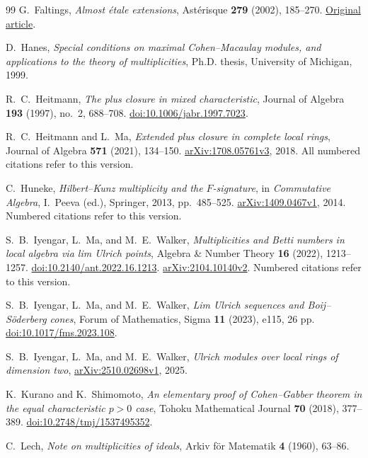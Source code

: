 \begin{thebibliography}{99}
G.~Faltings,
\emph{Almost \'etale extensions},
Ast\'erisque \textbf{279} (2002), 185--270.
\href{https://numdam.org/item/AST_2002__279__185_0/}{Original article}.

D.~Hanes,
\emph{Special conditions on maximal Cohen--Macaulay modules, and
applications to the theory of multiplicities},
Ph.D. thesis, University of Michigan, 1999.

R.~C.~Heitmann,
\emph{The plus closure in mixed characteristic},
Journal of Algebra \textbf{193} (1997), no.~2, 688--708.
\href{https://doi.org/10.1006/jabr.1997.7023}{doi:10.1006/jabr.1997.7023}.

R.~C.~Heitmann and L.~Ma,
\emph{Extended plus closure in complete local rings},
Journal of Algebra \textbf{571} (2021), 134--150.
\href{https://arxiv.org/abs/1708.05761v3}{arXiv:1708.05761v3}, 2018.
All numbered citations refer to this version.

C.~Huneke,
\emph{Hilbert--Kunz multiplicity and the $F$-signature},
in \emph{Commutative Algebra}, I.~Peeva (ed.),
Springer, 2013, pp.~485--525.
\href{https://arxiv.org/abs/1409.0467v1}{arXiv:1409.0467v1}, 2014.
Numbered citations refer to this version.

S.~B.~Iyengar, L.~Ma, and M.~E.~Walker,
\emph{Multiplicities and Betti numbers in local algebra via lim Ulrich points},
Algebra \& Number Theory \textbf{16} (2022), 1213--1257.
\href{https://doi.org/10.2140/ant.2022.16.1213}{doi:10.2140/ant.2022.16.1213}.
\href{https://arxiv.org/abs/2104.10140v2}{arXiv:2104.10140v2}.
Numbered citations refer to this version.

S.~B.~Iyengar, L.~Ma, and M.~E.~Walker,
\emph{Lim Ulrich sequences and Boij--S\"oderberg cones},
Forum of Mathematics, Sigma \textbf{11} (2023), e115, 26 pp.
\href{https://doi.org/10.1017/fms.2023.108}{doi:10.1017/fms.2023.108}.

S.~B.~Iyengar, L.~Ma, and M.~E.~Walker,
\emph{Ulrich modules over local rings of dimension two},
\href{https://arxiv.org/abs/2510.02698v1}{arXiv:2510.02698v1}, 2025.

K.~Kurano and K.~Shimomoto,
\emph{An elementary proof of Cohen--Gabber theorem in the equal
characteristic $p>0$ case},
Tohoku Mathematical Journal \textbf{70} (2018), 377--389.
\href{https://doi.org/10.2748/tmj/1537495352}{doi:10.2748/tmj/1537495352}.

C.~Lech,
\emph{Note on multiplicities of ideals},
Arkiv f\"or Matematik \textbf{4} (1960), 63--86.


\end{thebibliography}
